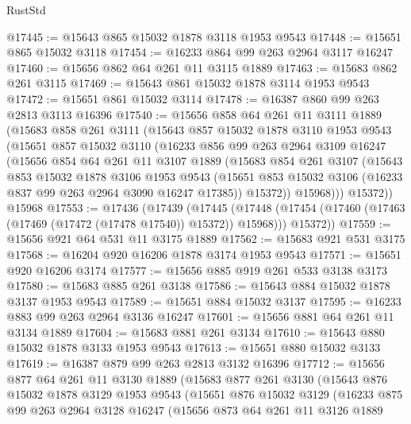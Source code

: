 \begin{lexlean}{RustStd}
\begin{coremodule}
@17445 := @15643 @865 @15032 @1878 @3118 @1953 @9543
@17448 := @15651 @865 @15032 @3118
@17454 := @16233 @864 @99 @263 @2964 @3117 @16247
@17460 := @15656 @862 @64 @261 @11 @3115 @1889
@17463 := @15683 @862 @261 @3115
@17469 := @15643 @861 @15032 @1878 @3114 @1953 @9543
@17472 := @15651 @861 @15032 @3114
@17478 := @16387 @860 @99 @263 @2813 @3113 @16396
@17540 := @15656
    @858
    @64
    @261
    @11
    @3111
    @1889
    (@15683
      @858
      @261
      @3111
      (@15643
        @857
        @15032
        @1878
        @3110
        @1953
        @9543
        (@15651
          @857
          @15032
          @3110
          (@16233
            @856
            @99
            @263
            @2964
            @3109
            @16247
            (@15656
              @854
              @64
              @261
              @11
              @3107
              @1889
              (@15683
                @854
                @261
                @3107
                (@15643
                  @853
                  @15032
                  @1878
                  @3106
                  @1953
                  @9543
                  (@15651 @853 @15032 @3106 (@16233 @837 @99 @263 @2964 @3090 @16247 @17385))
                  @15372))
              @15968)))
        @15372))
    @15968
@17553 := @17436
    (@17439
      (@17445
        (@17448 (@17454 (@17460 (@17463 (@17469 (@17472 (@17478 @17540)) @15372)) @15968)))
        @15372))
@17559 := @15656 @921 @64 @531 @11 @3175 @1889
@17562 := @15683 @921 @531 @3175
@17568 := @16204 @920 @16206 @1878 @3174 @1953 @9543
@17571 := @15651 @920 @16206 @3174
@17577 := @15656 @885 @919 @261 @533 @3138 @3173
@17580 := @15683 @885 @261 @3138
@17586 := @15643 @884 @15032 @1878 @3137 @1953 @9543
@17589 := @15651 @884 @15032 @3137
@17595 := @16233 @883 @99 @263 @2964 @3136 @16247
@17601 := @15656 @881 @64 @261 @11 @3134 @1889
@17604 := @15683 @881 @261 @3134
@17610 := @15643 @880 @15032 @1878 @3133 @1953 @9543
@17613 := @15651 @880 @15032 @3133
@17619 := @16387 @879 @99 @263 @2813 @3132 @16396
@17712 := @15656
    @877
    @64
    @261
    @11
    @3130
    @1889
    (@15683
      @877
      @261
      @3130
      (@15643
        @876
        @15032
        @1878
        @3129
        @1953
        @9543
        (@15651
          @876
          @15032
          @3129
          (@16233
            @875
            @99
            @263
            @2964
            @3128
            @16247
            (@15656
              @873
              @64
              @261
              @11
              @3126
              @1889

\end{coremodule}
\end{lexlean}

